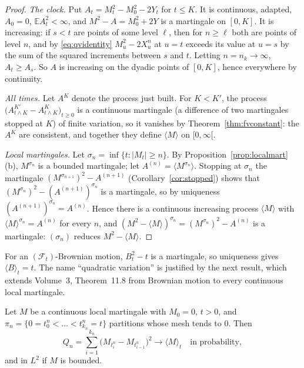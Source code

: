 \begin{proof}
\emph{The clock.} Put $A_t=M_t^2-M_0^2-2Y_t$ for $t\le K$. It is continuous, adapted, $A_0=0$, $\mathbb EA_t^2<\infty$, and $M^2-A=M_0^2+2Y$ is a martingale on $[0,K]$. It is increasing: if $s<t$ are points of some
level $\ell$, then for $n\ge\ell$ both are points of level $n$, and by \eqref{eq:qvidentity} $M^2_u-2X^n_u$ at $u=t$ exceeds its value at $u=s$ by the sum of the squared increments between $s$ and $t$. Letting
$n=n_k\to\infty$, $A_t\ge A_s$. So $A$ is increasing on the dyadic points of $[0,K]$, hence everywhere by continuity.

\emph{All times.} Let $A^K$ denote the process just built. For $K<K'$, the process $\bigl(A^{K'}_{t\wedge K}-A^K_{t\wedge K}\bigr)_{t\ge0}$ is a continuous martingale (a difference of two martingales stopped at $K$) of finite
variation, so it vanishes by Theorem~\ref{thm:fvconstant}: the $A^K$ are consistent, and together they define $\langle M\rangle$ on $[0,\infty[$.

\emph{Local martingales.} Let $\sigma_n=\inf\{t:|M_t|\ge n\}$. By Proposition~\ref{prop:localmart}(b), $M^{\sigma_n}$ is a bounded martingale; let $A^{(n)}=\langle M^{\sigma_n}\rangle$. Stopping at $\sigma_n$ the martingale
$(M^{\sigma_{n+1}})^2-A^{(n+1)}$ (Corollary~\ref{cor:stopped}) shows that $(M^{\sigma_n})^2-(A^{(n+1)})^{\sigma_n}$ is a martingale, so by uniqueness $(A^{(n+1)})^{\sigma_n}=A^{(n)}$. Hence there is a continuous increasing
process $\langle M\rangle$ with $\langle M\rangle^{\sigma_n}=A^{(n)}$ for every $n$, and $(M^2-\langle M\rangle)^{\sigma_n}=(M^{\sigma_n})^2-A^{(n)}$ is a martingale: $(\sigma_n)$ reduces $M^2-\langle M\rangle$.
\end{proof}

For an $(\mathcal F_t)$-Brownian motion, $B^2_t-t$ is a martingale, so uniqueness gives $\langle B\rangle_t=t$. The name ``quadratic variation'' is justified by the next result, which extends Volume~3, Theorem~11.8
from Brownian motion to every continuous local martingale.

\begin{proposition}\label{prop:qvsums}
Let $M$ be a continuous local martingale with $M_0=0$, $t>0$, and $\pi_n=\{0=t^n_0<\dots<t^n_{k_n}=t\}$ partitions whose mesh tends to $0$. Then
\[
Q_n=\sum_{i=1}^{k_n}\bigl(M_{t^n_i}-M_{t^n_{i-1}}\bigr)^2\longrightarrow\langle M\rangle_t\quad\text{in probability},
\]
and in $L^2$ if $M$ is bounded.
\end{proposition}

